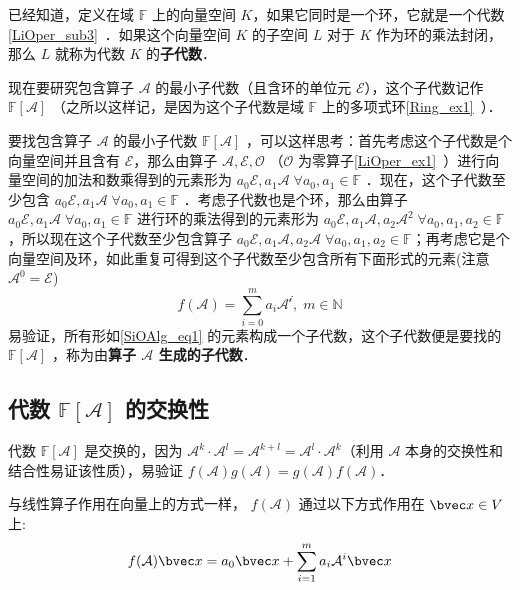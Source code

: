 
已经知道，定义在域 $\mathbb{F}$ 上的向量空间 $K$，如果它同时是一个环，它就是一个代数\autoref{LiOper_sub3}~．如果这个向量空间 $K$ 的子空间 $L$ 对于 $K$ 作为环的乘法封闭，那么 $L$ 就称为代数 $K$ 的\textbf{子代数}．

现在要研究包含算子 $\mathcal{A}$ 的最小子代数（且含环的单位元 $\mathcal{E}$），这个子代数记作 $\mathbb{F}[\mathcal A]$ （之所以这样记，是因为这个子代数是域 $\mathbb{F}$ 上的多项式环\autoref{Ring_ex1}~）．

要找包含算子 $\mathcal{A}$ 的最小子代数 $\mathbb{F}[\mathcal A]$ ，可以这样思考：首先考虑这个子代数是个向量空间并且含有 $\mathcal{E}$，那么由算子 $\mathcal{A,E,O}$ （$\mathcal{O}$ 为零算子\autoref{LiOper_ex1}~）进行向量空间的加法和数乘得到的元素形为 $a_0\mathcal{E},a_1\mathcal{A}\;\forall a_0,a_1\in\mathbb{F}$ ．现在，这个子代数至少包含 $a_0\mathcal{E},a_1\mathcal{A}\;\forall a_0,a_1\in\mathbb{F}$ ．考虑子代数也是个环，那么由算子 $a_0\mathcal{E},a_1\mathcal{A}\;\forall a_0,a_1\in\mathbb{F}$ 进行环的乘法得到的元素形为 $a_0\mathcal{E},a_1\mathcal{A},a_2\mathcal{A}^2\;\forall a_0,a_1,a_2\in\mathbb{F}$，所以现在这个子代数至少包含算子 $a_0\mathcal{E},a_1\mathcal{A},a_2\mathcal{A}\;\forall a_0,a_1,a_2\in\mathbb{F}$；再考虑它是个向量空间及环，如此重复可得到这个子代数至少包含所有下面形式的元素(注意 $\mathcal{A}^0=\mathcal{E}$)
\begin{equation}\label{SiOAlg_eq1}
f(\mathcal{A})=\sum_{i=0}^ma_i\mathcal{A^i},\;m\in\mathbb{N}
\end{equation}
易验证，所有形如\autoref{SiOAlg_eq1} 的元素构成一个子代数，这个子代数便是要找的 $\mathbb{F}[\mathcal A]$ ，称为由\textbf{算子 $\mathcal{A}$ 生成的子代数}．
\subsection{代数 $\mathbb{F}[\mathcal{A}]$ 的交换性}
代数 $\mathbb{F}[\mathcal A]$ 是交换的，因为 $\mathcal A^{k}\cdot \mathcal{A}^l=\mathcal{A}^{k+l}=\mathcal A^{l}\cdot \mathcal{A}^k$（利用 $\mathcal{A}$ 本身的交换性和结合性易证该性质），易验证 $f(\mathcal{A})g(\mathcal{A})=g(\mathcal{A})f(\mathcal{A})$．

与线性算子作用在向量上的方式一样， $f(\mathcal{A})$ 通过以下方式作用在 $\bvec x\in V$ 上:
\begin{equation}
f(\mathcal{A})\bvec x=a_0\bvec x+\sum_{i=1}^m a_i\mathcal{A}^i\bvec x
\end{equation}
